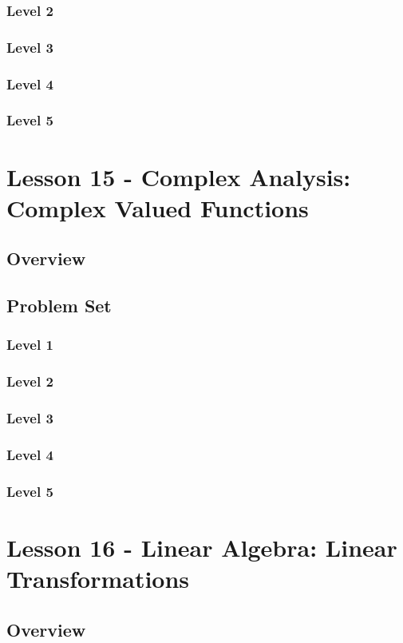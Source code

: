 \documentclass{article}
\begin{document}
\subsubsection{Level 2}
\subsubsection{Level 3}
\subsubsection{Level 4}
\subsubsection{Level 5}
\pagebreak

\section{Lesson 15 - Complex Analysis: Complex Valued Functions}
\subsection{Overview}
\subsection{Problem Set}
\subsubsection{Level 1}
\subsubsection{Level 2}
\subsubsection{Level 3}
\subsubsection{Level 4}
\subsubsection{Level 5}
\pagebreak

\section{Lesson 16 - Linear Algebra: Linear Transformations}
\subsection{Overview}
\end{document}
